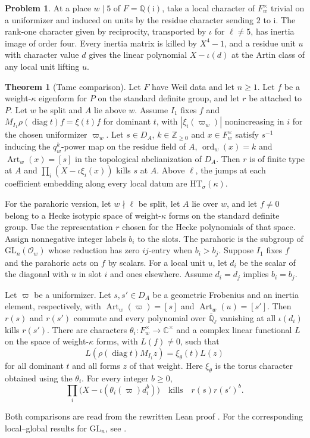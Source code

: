 \documentclass[reqno]{amsart}
\theoremstyle{definition}
\newtheorem{problem}{Problem}[section]
\newtheorem{theorem}{Theorem}[section]
\newcommand{\Q}{\mathbb Q}
\newcommand{\Z}{\mathbb Z}
\newcommand{\C}{\mathbb C}
\newcommand{\Qlbar}{\overline{\Q}_\ell}
\newcommand{\GL}{\mathrm{GL}}
\newcommand{\HT}{\mathrm{HT}}
\newcommand{\ord}{\operatorname{ord}}
\newcommand{\rec}{\operatorname{Art}}
\newcommand{\ii}{\mathrm i}
\begin{document}
\begin{problem}\label{pr:tame-line}
At a place \(w\mid 5\) of \(F=\Q(\ii)\), take a local character of \(F_w^\times\) trivial on a uniformizer and induced on units by the residue character sending \(2\) to \(\ii\).  The rank-one character given by reciprocity, transported by \(\iota\) for \(\ell\ne5\), has inertia image of order four.  Every inertia matrix is killed by \(X^4-1\), and a residue unit \(u\) with character value \(d\) gives the linear polynomial \(X-\iota(d)\) at the Artin class of any local unit lifting \(u\).
\end{problem}

\begin{theorem}[Tame comparison]\label{thm:tame}
Let \(F\) have Weil data and let \(n\ge1\).
Let \(f\) be a weight-\(\kappa\) eigenform for \(P\) on the standard
definite group, and let \(r\) be attached to \(P\).  Let \(w\) be split and \(A\) lie above \(w\).  Assume \(I_1\) fixes \(f\) and \(M_{I_1}\rho(\operatorname{diag}t) f=\xi(t)f\) for dominant \(t\), with \(|\xi_i(\varpi_w)|\) nonincreasing in \(i\) for the chosen uniformizer \(\varpi_w\).  Let \(s\in D_A\), \(k\in\Z_{\ge0}\) and \(x\in F_w^\times\) satisfy \(s^{-1}\) inducing the \(q_w^k\)-power map on the residue field of \(A\), \(\ord_w(x)=k\) and \(\rec_w(x)=[s]\) in the topological abelianization of \(D_A\).  Then \(r\) is of finite type at \(A\) and \(\prod_i(X-\iota\xi_i(x))\) kills \(s\) at \(A\).  Above \(\ell\), the jumps at each coefficient embedding along every local datum are \(\HT_\sigma(\kappa)\).

For the parahoric version, let \(w\nmid\ell\) be split, let \(A\) lie
over \(w\), and let \(f\ne0\) belong to a Hecke isotypic space of
weight-\(\kappa\) forms on the standard definite group.  Use the representation \(r\) chosen for the Hecke polynomials of that space.  Assign nonnegative integer labels \(b_i\) to the slots.  The parahoric is the subgroup of \(\GL_n(\mathcal O_w)\) whose reduction has zero \(ij\)-entry when \(b_i>b_j\).  Suppose \(I_1\) fixes \(f\) and the parahoric acts on \(f\) by scalars.  For a local unit \(u\), let \(d_i\) be the scalar of the diagonal with \(u\) in slot \(i\) and ones elsewhere.  Assume \(d_i=d_j\) implies \(b_i=b_j\).

Let \(\varpi\) be a uniformizer.  Let \(s,s'\in D_A\) be a geometric Frobenius and an inertia element, respectively, with \(\rec_w(\varpi)=[s]\) and \(\rec_w(u)=[s']\).  Then \(r(s)\) and \(r(s')\) commute and every polynomial over \(\Qlbar\) vanishing at all \(\iota(d_i)\) kills \(r(s')\).  There are characters \(\theta_i:F_w^\times\to\C^\times\) and a complex linear functional \(L\) on the space of weight-\(\kappa\) forms, with \(L(f)\ne0\), such that
\[
  L(\rho(\operatorname{diag}t)M_{I_1}z)=\xi_\theta(t)L(z)
\]
for all dominant \(t\) and all forms \(z\) of that weight.  Here \(\xi_\theta\) is the torus character obtained using the \(\theta_i\).  For every integer \(b\ge0\),
\[
 \prod_i\bigl(X-\iota(\theta_i(\varpi)d_i^b)\bigr)
 \quad\text{kills}\quad r(s)r(s')^b.
\]
\end{theorem}
Both comparisons are read from the rewritten Lean proof \cite{GL}.  For the corresponding local--global results for \(\GL_n\), see \cite{HT,TY,Car,BLGGT2}.
\end{document}
